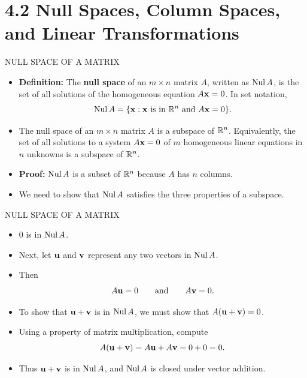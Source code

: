 \section[4.2 Null and Column Spaces]{4.2 Null Spaces, Column Spaces, and Linear Transformations}

\begin{frame}[shrink=15]{NULL SPACE OF A MATRIX}
\begin{itemize}
\item \textbf{Definition:} The \textcolor{sourceblue}{\textbf{null space}} of an $m\times n$ matrix $A$, written as $\operatorname{Nul} A$, is the set of all solutions of the homogeneous equation $A\mathbf{x}=0$. In set notation,
\[
\operatorname{Nul} A=\{\mathbf{x}:\mathbf{x}\text{ is in }\mathbb{R}^n\text{ and }A\mathbf{x}=0\}.
\]
\item {} The null space of an $m\times n$ matrix $A$ is a subspace of $\mathbb{R}^n$. Equivalently, the set of all solutions to a system $A\mathbf{x}=0$ of $m$ homogeneous linear equations in $n$ unknowns is a subspace of $\mathbb{R}^n$.
\item \textbf{Proof:} $\operatorname{Nul} A$ is a subset of $\mathbb{R}^n$ because $A$ has $n$ columns.
\item We need to show that $\operatorname{Nul} A$ satisfies the three properties of a subspace.
\end{itemize}
\end{frame}

\begin{frame}[shrink=13]{NULL SPACE OF A MATRIX}
\begin{itemize}
\item $0$ is in $\operatorname{Nul} A$.
\item Next, let $\mathbf{u}$ and $\mathbf{v}$ represent any two vectors in $\operatorname{Nul} A$.
\item Then
\[
A\mathbf{u}=0\qquad\text{and}\qquad A\mathbf{v}=0.
\]
\item To show that $\mathbf{u}+\mathbf{v}$ is in $\operatorname{Nul} A$, we must show that $A(\mathbf{u}+\mathbf{v})=0$.
\item Using a property of matrix multiplication, compute
\[
A(\mathbf{u}+\mathbf{v})=A\mathbf{u}+A\mathbf{v}=0+0=0.
\]
\item Thus $\mathbf{u}+\mathbf{v}$ is in $\operatorname{Nul} A$, and $\operatorname{Nul} A$ is closed under vector addition.
\end{itemize}
\end{frame}

